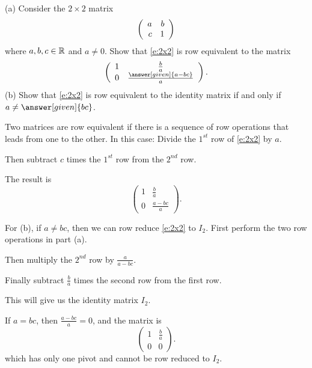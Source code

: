 \documentclass{ximera}
\begin{document}
\begin{exercise} \label{c2.3.8}
(a) Consider the $2\times 2$ matrix
\begin{equation}  \label{e:2x2}
\left(\begin{array}{rr} a & b\\ c &1\end{array}\right)
\end{equation}
where $a,b,c\in\mbox{$\Bbb{R}$}$ and $a\neq 0$.  Show that \eqref{e:2x2}
is row equivalent to the matrix
\[
\left(\begin{array}{cc} 1 & \frac{b}{a} \\ 0 & \frac{\answer[given]{a-bc}}{a}
\end{array} \right).
\]
(b)  Show that \eqref{e:2x2} is row equivalent to the
identity matrix if and only if $a\neq \answer[given]{bc}$.

\begin{hint}
Two matrices are row equivalent if there is a sequence of row operations
that leads from one to the other.  In this case: Divide the $1^{st}$ row of \eqref{e:2x2} by $a$.
\end{hint}
\begin{hint}
Then subtract $c$ times the $1^{st}$ row from the $2^{nd}$ row.
\end{hint}
\begin{hint}
The result is
\[
\left(\begin{array}{cc} 1 & \frac{b}{a} \\ 0 & \frac{a - bc}{a}\end{array}
\right).
\]
\end{hint}
\begin{hint}
For (b), if $a \neq bc$, then we can row reduce \eqref{e:2x2} to $I_2$.  First
perform the two row operations in part (a).
\end{hint}
\begin{hint}
  Then multiply the $2^{nd}$ row by $\frac{a}{a - bc}$.
\end{hint}
\begin{hint}
  Finally subtract $\frac{b}{a}$ times the second row from the first row.
\end{hint}
\begin{hint}
This will give us the identity matrix $I_2$.
\end{hint}
\begin{hint}
  If $a = bc$, then $\frac{a - bc}{a} = 0$, and the matrix is
\[
\left(\begin{array}{cc} 1 & \frac{b}{a} \\ 0 & 0\end{array} \right).
\]
which has only one pivot and cannot be row reduced to $I_2$.
\end{hint}


\end{exercise}
\end{document}

